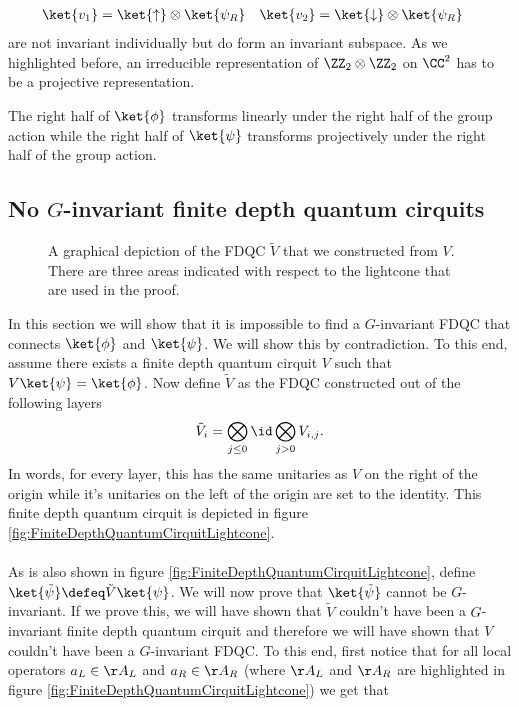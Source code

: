 \begin{align}
	\ket{v_1}&=\ket{\uparrow}\otimes\ket{\psi_R}&\ket{v_2}&=\ket{\downarrow}\otimes\ket{\psi_R}
\end{align}
are not invariant individually but do form an invariant subspace. As we highlighted before, an irreducible representation of $\ZZ_2\otimes\ZZ_2$ on $\CC^2$ has to be a projective representation.
\begin{conclusion}
	The right half of $\ket{\phi}$ transforms linearly under the right half of the group action while the right half of $\ket{\psi}$ transforms projectively under the right half of the group action.
\end{conclusion}
\subsection{No $G$-invariant finite depth quantum cirquits}
\begin{figure}
	\centering
	\scalebox{0.65}{
		
	}
	\caption{A graphical depiction of the FDQC $\tilde{V}$ that we constructed from $V$. There are three areas indicated with respect to the lightcone that are used in the proof.}	\label{fig:ConnectingPsiAndPsi0Proof2_WithLightcone}
\end{figure}
In this section we will show that it is impossible to find a $G$-invariant FDQC that connects $\ket{\phi}$ and $\ket{\psi}$. We will show this by contradiction. To this end, assume there exists a finite depth quantum cirquit $V$ such that $V\ket{\psi}=\ket{\phi}$. Now define $\tilde{V}$ as the FDQC constructed out of the following layers
\begin{equation}
	\tilde{V}_i=\bigotimes_{j\leq 0}\id \bigotimes_{j> 0}V_{i,j}.
\end{equation}
In words, for every layer, this has the same unitaries as $V$ on the right of the origin while it's unitaries on the left of the origin are set to the identity. This finite depth quantum cirquit is depicted in figure \ref{fig:FiniteDepthQuantumCirquitLightcone}.\\\\
As is also shown in figure \ref{fig:FiniteDepthQuantumCirquitLightcone}, define $\ket{\tilde{\psi}}\defeq \tilde{V}\ket{\psi}$. We will now prove that $\ket{\tilde{\psi}}$ cannot be $G$-invariant. If we prove this, we will have shown that $\tilde{V}$ couldn't have been a $G$-invariant finite depth quantum cirquit and therefore we will have shown that $V$ couldn't have been a $G$-invariant FDQC. To this end, first notice that for all local operators $a_L\in\AA_L$ and $a_R\in\AA_R$ (where $\AA_L$ and $\AA_R$ are highlighted in figure \ref{fig:FiniteDepthQuantumCirquitLightcone}) we get that
